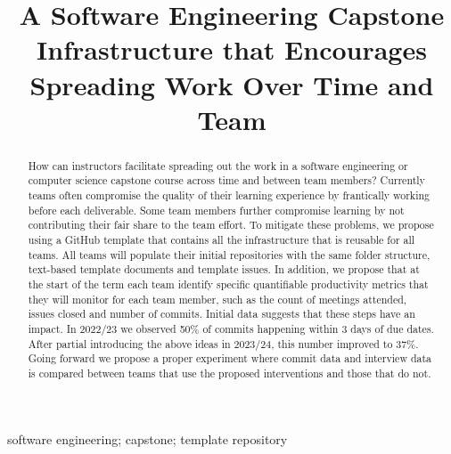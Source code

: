 \documentclass[10pt, conference]{IEEEtran}
\begin{document}
\title{A Software Engineering Capstone Infrastructure that Encourages Spreading
Work Over Time and Team}

\author{
}

\maketitle
  
\begin{abstract}

How can instructors facilitate spreading out the work in a software engineering
or computer science capstone course across time and between team members?
Currently teams often compromise the quality of their learning experience by
frantically working before each deliverable.  Some team members further
compromise learning by not contributing their fair share to the team effort. To
mitigate these problems, we propose using a GitHub template that contains all
the infrastructure that is reusable for all teams.  All teams will populate
their initial repositories with the same folder structure, text-based template
documents and template issues. In addition, we propose that at the start of the
term each team identify specific quantifiable productivity metrics that they
will monitor for each team member, such as the count of meetings attended,
issues closed and number of commits.  Initial data suggests that these steps
have an impact.  In 2022/23 we observed 50\% of commits happening within 3 days
of due dates.  After partial introducing the above ideas in 2023/24, this number
improved to 37\%. Going forward we propose a proper experiment where commit data
and interview data is compared between teams that use the proposed interventions
and those that do not.

\end{abstract}

\begin{IEEEkeywords}
software engineering; capstone; template repository
\end{IEEEkeywords}
\end{document}
